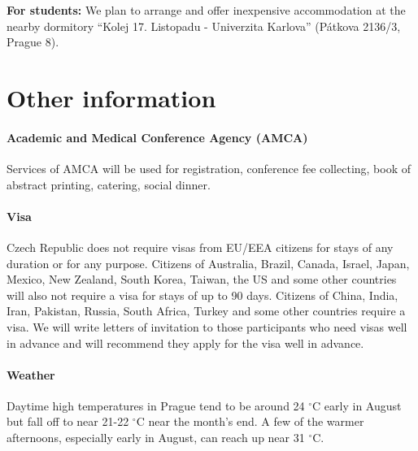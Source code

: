 \documentclass[12pt]{extarticle}
\begin{document}
{\bf For students:} We plan to arrange and offer inexpensive accommodation at the nearby dormitory ``Kolej 17.
Listopadu - Univerzita Karlova'' (Pátkova 2136/3, Prague 8).

\section*{Other information}

\paragraph{Academic and Medical Conference Agency (AMCA)}
Services of AMCA will be used for registration, conference fee
collecting, book of abstract printing, catering, social dinner.

\paragraph{Visa}
Czech Republic does not require visas from EU/EEA citizens for stays
of any duration or for any purpose. Citizens of Australia, Brazil,
Canada, Israel, Japan, Mexico, New Zealand, South Korea, Taiwan, the
US and some other countries will also not require a visa for stays of
up to 90 days. Citizens of China, India, Iran, Pakistan, Russia, South
Africa, Turkey and some other countries require a visa. We will write
letters of invitation to those participants who need visas well in
advance and will recommend they apply for the visa well in advance.

\paragraph{Weather}
Daytime high temperatures in Prague tend to be around 24 ${}^\circ$C early in August but fall off to near
21-22 ${}^\circ$C near the month's end. A few of the warmer afternoons, especially early in August, can reach
up near 31 ${}^\circ$C.
\end{document}
